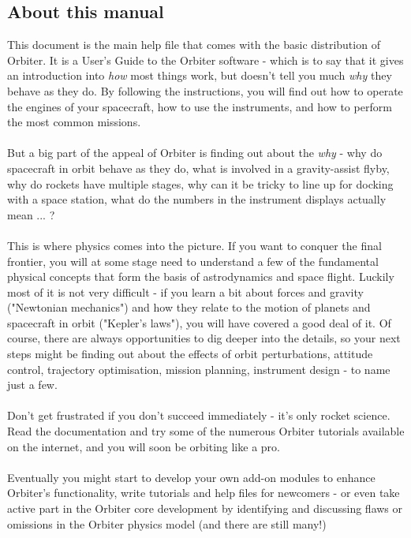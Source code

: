 \documentclass[Orbiter User Manual.tex]{subfiles}
\begin{document}
\subsection{About this manual}
This document is the main help file that comes with the basic distribution of Orbiter. It is a User's Guide to the Orbiter software - which is to say that it gives an introduction into \textit{how} most things work, but doesn't tell you much \textit{why} they behave as they do. By following the instructions, you will find out how to operate the engines of your spacecraft, how to use the instruments, and how to perform the most common missions.\\
\\
But a big part of the appeal of Orbiter is finding out about the \textit{why} - why do spacecraft in orbit behave as they do, what is involved in a gravity-assist flyby, why do rockets have multiple stages, why can it be tricky to line up for docking with a space station, what do the numbers in the instrument displays actually mean ... ?\\
\\
This is where physics comes into the picture. If you want to conquer the final frontier, you will at some stage need to understand a few of the fundamental physical concepts that form the basis of astrodynamics and space flight. Luckily most of it is not very difficult - if you learn a bit about forces and gravity ("Newtonian mechanics") and how they relate to the motion of planets and spacecraft in orbit ("Kepler's laws"), you will have covered a good deal of it. Of course, there are always opportunities to dig deeper into the details, so your next steps might be finding out about the effects of orbit perturbations, attitude control, trajectory optimisation, mission planning, instrument design - to name just a few.\\
\\
Don't get frustrated if you don't succeed immediately - it's only rocket science. Read the documentation and try some of the numerous Orbiter tutorials available on the internet, and you will soon be orbiting like a pro.\\
\\
Eventually you might start to develop your own add-on modules to enhance Orbiter's functionality, write tutorials and help files for newcomers - or even take active part in the Orbiter core development by identifying and discussing flaws or omissions in the Orbiter physics model (and there are still many!)
\end{document}
